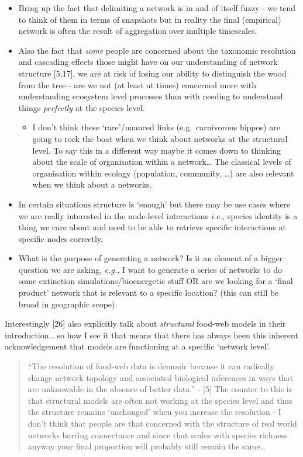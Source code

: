 \documentclass[
]{article}
\providecommand{\tightlist}{%
  \setlength{\itemsep}{0pt}\setlength{\parskip}{0pt}}\usepackage{longtable,booktabs,array}
\begin{document}
\begin{itemize}
\item
  Bring up the fact that delimiting a network is in and of itself fuzzy
  - we tend to think of them in terms of snapshots but in reality the
  final (empirical) network is often the result of aggregation over
  multiple timescales.
\item
  Also the fact that \emph{some} people are concerned about the
  taxonomic resolution and cascading effects those might have on our
  understanding of network structure {[}5,17{]}, we are at risk of
  losing our ability to distinguish the wood from the tree - are we not
  (at least at times) concerned more with understanding ecosystem level
  processes than with needing to understand things \emph{perfectly} at
  the species level.

  \begin{itemize}
  \tightlist
  \item
    I don't think these `rare'/nuanced links (e.g.~carnivorous hippos)
    are going to rock the boat when we think about networks at the
    structural level. To say this in a different way maybe it comes down
    to thinking about the scale of organisation within a network\ldots{}
    The classical levels of organisation within ecology (population,
    community, \ldots) are also relevant when we think about a networks.
  \end{itemize}
\item
  In certain situations structure is `enough' but there may be use cases
  where we are really interested in the node-level interactions
  \emph{i.e.,} species identity is a thing we care about and need to be
  able to retrieve specific interactions at specific nodes correctly.
\item
  What is the purpose of generating a network? Is it an element of a
  bigger question we are asking, \emph{e.g.,} I want to generate a
  series of networks to do some extinction simulations/bioenergetic
  stuff OR are we looking for a `final product' network that is relevant
  to a specific location? (this can still be broad in geographic scope).
\end{itemize}

Interestingly {[}26{]} also explicitly talk about \emph{structural}
food-web models in their introduction\ldots{} so how I see it that means
that there has always been this inherent acknowledgement that models are
functioning at a specific `network level'.

\begin{quote}
``The resolution of food-web data is demonic because it can radically
change network topology and associated biological inferences in ways
that are unknowable in the absence of better data.'' - {[}5{]} The
counter to this is that structural models are often not working at the
species level and thus the structure remains `unchanged' when you
increase the resolution - I don't think that people are that concerned
with the structure of real world networks barring connectance and since
that scales with species richness anyway your final proportion will
probably still remain the same\ldots{}
\end{quote}
\end{document}
